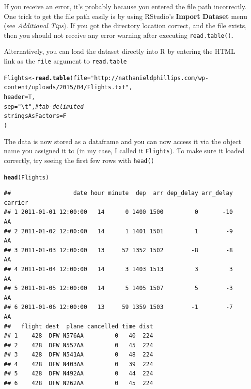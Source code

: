 \documentclass{tufte-book}\usepackage[]{graphicx}\usepackage[]{color}
\makeatletter
\newcommand{\hlstr}[1]{\textcolor[rgb]{0.192,0.494,0.8}{#1}}%
\newcommand{\hlcom}[1]{\textcolor[rgb]{0.678,0.584,0.686}{\textit{#1}}}%
\newcommand{\hlstd}[1]{\textcolor[rgb]{0.345,0.345,0.345}{#1}}%
\newcommand{\hlkwb}[1]{\textcolor[rgb]{0.69,0.353,0.396}{#1}}%
\newcommand{\hlkwc}[1]{\textcolor[rgb]{0.333,0.667,0.333}{#1}}%
\newcommand{\hlkwd}[1]{\textcolor[rgb]{0.737,0.353,0.396}{\textbf{#1}}}%
\newenvironment{kframe}{%
 \def\at@end@of@kframe{}%
 \ifinner\ifhmode%
  \def\at@end@of@kframe{\end{minipage}}%
  \begin{minipage}{\columnwidth}%
 \fi\fi%
 \def\FrameCommand##1{\hskip\@totalleftmargin \hskip-\fboxsep
 \colorbox{shadecolor}{##1}\hskip-\fboxsep
     \hskip-\linewidth \hskip-\@totalleftmargin \hskip\columnwidth}%
 \MakeFramed {\advance\hsize-\width
   \@totalleftmargin\z@ \linewidth\hsize
   \@setminipage}}%
 {\par\unskip\endMakeFramed%
 \at@end@of@kframe}
\newenvironment{knitrout}{}{} %
\makeatother
\begin{document}
\begin{footnotesize}
If you receive an error, it's probably because you entered the file path incorrectly. One trick to get the file path easily is by using RStudio's \textbf{Import Dataset} menu (see \textit{Additional Tips}). If you got the directory location correct, and the file exists, then you should not receive any error warning after executing \texttt{read.table()}.

Alternatively, you can load the dataset directly into R by entering the HTML link as the \texttt{file} argument to \texttt{read.table}

\begin{footnotesize}
\begin{knitrout}
\color{fgcolor}\begin{kframe}
\begin{alltt}
\hlstd{Flights} \hlkwb{<-} \hlkwd{read.table}\hlstd{(}\hlkwc{file} \hlstd{=} \hlstr{"http://nathanieldphillips.com/wp-content/uploads/2015/04/Flights.txt"}\hlstd{,}
                      \hlkwc{header} \hlstd{= T,}
                      \hlkwc{sep} \hlstd{=} \hlstr{"\textbackslash{}t"}\hlstd{,} \hlcom{# tab-delimited}
                      \hlkwc{stringsAsFactors} \hlstd{= F}
                      \hlstd{)}
\end{alltt}
\end{kframe}
\end{knitrout}
\end{footnotesize}

The data is now stored as a dataframe and you can now access it via the object name you assigned it to (in my case, I called it \texttt{Flights}). To make sure it loaded correctly, try seeing the first few rows with \texttt{head()}

\begin{footnotesize}
\begin{knitrout}
\color{fgcolor}\begin{kframe}
\begin{alltt}
\hlkwd{head}\hlstd{(Flights)}
\end{alltt}
\begin{verbatim}
##                  date hour minute  dep  arr dep_delay arr_delay carrier
## 1 2011-01-01 12:00:00   14      0 1400 1500         0       -10      AA
## 2 2011-01-02 12:00:00   14      1 1401 1501         1        -9      AA
## 3 2011-01-03 12:00:00   13     52 1352 1502        -8        -8      AA
## 4 2011-01-04 12:00:00   14      3 1403 1513         3         3      AA
## 5 2011-01-05 12:00:00   14      5 1405 1507         5        -3      AA
## 6 2011-01-06 12:00:00   13     59 1359 1503        -1        -7      AA
##   flight dest  plane cancelled time dist
## 1    428  DFW N576AA         0   40  224
## 2    428  DFW N557AA         0   45  224
## 3    428  DFW N541AA         0   48  224
## 4    428  DFW N403AA         0   39  224
## 5    428  DFW N492AA         0   44  224
## 6    428  DFW N262AA         0   45  224
\end{verbatim}
\end{kframe}
\end{knitrout}
\end{footnotesize}


\end{footnotesize}
\end{document}
